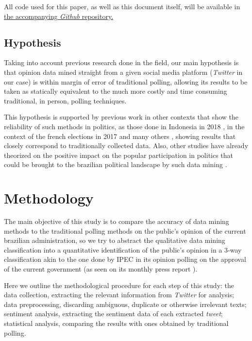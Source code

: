\documentclass[conference]{IEEEtran}
\begin{document}
All code used for this paper, as well as this document itself, will be available in \href{https://github.com/Ocramoi/twitter-political-analysis-accuracy}{the accompanying \emph{Github} repository.}

\subsection{Hypothesis}
\label{sec:orgf0132e1}
Taking into account previous research done in the field, our main hypothesis is that opinion data mined straight from a given social media platform (\emph{Twitter} in our case) is within margin of error of traditional polling, allowing its results to be taken as statically equivalent to the much more costly and time consuming traditional, in person, polling techniques.

This hypothesis is supported by previous work in other contexts that show the reliability of such methods in politics, as those done in Indonesia in 2018 \cite{Budiharto2018}, in the context of the french elections in 2017 \cite{Wang2017} and many others \cite{Tumasjan2010}\cite{Kassraie2017}, showing results that closely correspond to traditionally collected data. Also, other studies have already theorized on the positive impact on the popular participation in politics that could be brought to the brazilian political landscape by such data mining \cite{Oliveira2019} \cite{Oliveira2017}.

\section{Methodology}
\label{sec:org1f14c6a}
The main objective of this study is to compare the accuracy of data mining methods to the traditional polling methods on the public's opinion of the current brazilian administration, so we try to abstract the qualitative data mining classification into a quantitative identification of the public's opinion in a 3-way classification akin to the one done by IPEC in its opinion polling on the approval of the current government (as seen on its monthly press report \cite{IpecSetembro}).

Here we outline the methodological procedure for each step of this study: the data collection, extracting the relevant information from \emph{Twitter} for analysis; data preprocessing, discarding ambiguous, duplicate or otherwise irrelevant texts; sentiment analysis, extracting the sentiment data of each extracted \emph{tweet}; statistical analysis, comparing the results with ones obtained by traditional polling.
\end{document}
